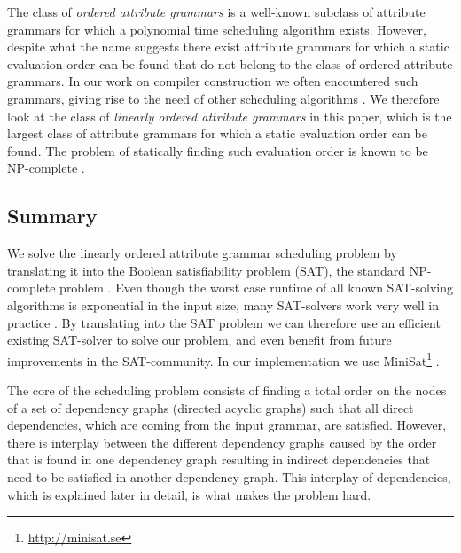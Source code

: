 \documentclass{llncs}
\begin{document}
The class of \emph{ordered attribute grammars} \cite{kastens80} is a well-known subclass of attribute grammars for which a polynomial time scheduling algorithm exists. However, despite what the name suggests there exist attribute grammars for which a static evaluation order can be found that do not belong to the class of ordered attribute grammars. In our work on compiler construction we often encountered such grammars, giving rise to the need of other scheduling algorithms \cite{bransen2012,Binsbergen:2015}. We therefore look at the class of \emph{linearly ordered attribute grammars} in this paper, which is the largest class of attribute grammars for which a static evaluation order can be found. The problem of statically finding such evaluation order is known to be NP-complete \cite{engelfriet82}.

\subsection{Summary}
We solve the linearly ordered attribute grammar scheduling problem by translating it into the Boolean satisfiability problem (SAT), the standard NP-complete problem \cite{Cook:1971}. Even though the worst case runtime of all known SAT-solving algorithms is exponential in the input size, many SAT-solvers work very well in practice \cite{sat-practice}. By translating into the SAT problem we can therefore use an efficient existing SAT-solver to solve our problem, and even benefit from future improvements in the SAT-community. In our implementation we use MiniSat\footnote{\url{http://minisat.se}} \cite{Een:2004}.

The core of the scheduling problem consists of finding a total order on the nodes of a set of dependency graphs (directed acyclic graphs) such that all direct dependencies, which are coming from the input grammar, are satisfied. However, there is interplay between the different dependency graphs caused by the order that is found in one dependency graph resulting in indirect dependencies that need to be satisfied in another dependency graph. This interplay of dependencies, which is explained later in detail, is what makes the problem hard.
\end{document}
